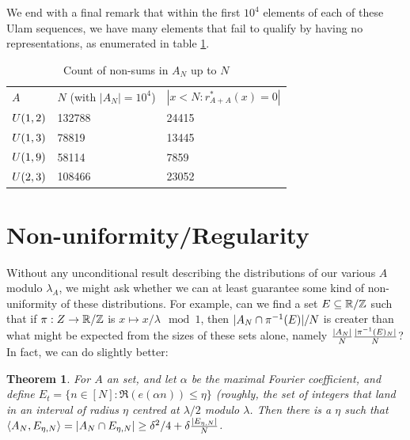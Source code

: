 \documentclass{report}
\newtheorem{theorem}{Theorem}[section]
\newtheorem{definition}[theorem]{Definition}
\theoremstyle{remark}
\numberwithin{equation}{section}
\begin{document}
We end with a final remark that within the first $10^4$ elements of
each of these Ulam sequences, we have many elements that fail to
qualify by having no representations, as enumerated in table
\ref{tab:nonsums_count}.  

\begin{table}
\caption{Count of non-sums in $A_N$ up to
  $N$}\label{tab:nonsums_count}
\centering
\begin{tabular}{lll}
$A$ & $N$ (with $|A_N| = 10^4$) & $|x < N : r^*_{A+A}(x) = 0|$\\
$U(1,2)$ & 132788 & 24415\\
$U(1,3)$ & 78819 & 13445\\
$U(1,9)$ & 58114 & 7859\\
$U(2,3)$ & 108466 & 23052
\end{tabular}
\end{table}

\section{Non-uniformity/Regularity}


Without any unconditional result describing the distributions of our
various $A$ modulo $\lambda_A$, we might ask whether we can at least
guarantee some kind of non-uniformity of these distributions.  For
example, can we find a set $E \subseteq \mathbb{R}/\mathbb{Z}$ such that if
$\pi : Z \to \mathbb{R}/\mathbb{Z}$ is $x \mapsto x/\lambda \mod{1}$, then
$|A_N \cap \pi^{-1}(E)|/N$ is creater than what might be expected from
the sizes of these sets alone, namely
$\frac{|A_N|}{N}\frac{|\pi^{-1}(E)_N|}{N}$?  In fact, we can do
slightly better:

\begin{theorem}\label{thm:regularity}
  For $A$ an \relevant set, and let $\alpha$ be the maximal Fourier
  coefficient, and define
  $E_{t} = \{n \in [N] : \Re(e(\alpha n)) \leq \eta\}$ (roughly, the
  set of integers that land in an interval of radius $\eta$ centred at
  $\lambda/2$ modulo $\lambda$.  Then there is a $\eta$ such that
  $\left<A_N, E_{\eta,N}\right> = |A_N \cap E_{\eta,N}| \geq \delta^2/4 +
  \delta \frac{|E_{\eta,N}|}{N}$.
\end{theorem}
\end{document}
